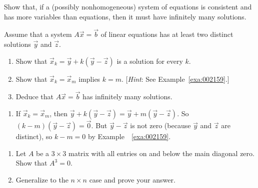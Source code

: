 \documentclass{ximera}
\begin{document}
\begin{problem}\label{prob:4.77}
Show that, if a (possibly nonhomogeneous) system of equations is consistent and has more variables than equations, then it must have infinitely many solutions. %

\end{problem}

\begin{problem}\label{prob:4.78}
Assume that a system $A\vec{x} = \vec{b}$ of linear equations has at least two distinct solutions $\vec{y}$ and $\vec{z}$.


\begin{enumerate}[label={\alph*.}]
\item Show that $\vec{x}_{k} = \vec{y} + k(\vec{y} - \vec{z})$ is a solution for every $k$.

\item Show that $\vec{x}_{k} = \vec{x}_{m}$ implies $k = m$. [\textit{Hint}: See Example~\ref{exa:002159}.]

\item Deduce that $A\vec{x} = \vec{b}$ has infinitely many solutions.

\end{enumerate}
\begin{hint}
\begin{enumerate}
\item  If $\vec{x}_{k} = \vec{x}_{m}$, then $\vec{y} + k(\vec{y} - \vec{z}) = \vec{y} + m(\vec{y} - \vec{z})$. So $(k - m)(\vec{y} - \vec{z}) = \vec{0}$. But $\vec{y} - \vec{z}$ is not zero (because $\vec{y}$ and $\vec{z}$ are distinct), so $k - m = 0$ by Example~~\ref{exa:002159}.

\end{enumerate}
\end{hint}
\end{problem}


\begin{problem}\label{prob:4.79a}

\begin{enumerate}
\item Let $A$ be a $3 \times 3$ matrix with all entries on and below the main diagonal zero. Show that $A^{3} = 0$.

\item Generalize to the $n \times n$ case and prove your answer.

\end{enumerate}
\end{problem}
\end{document}
